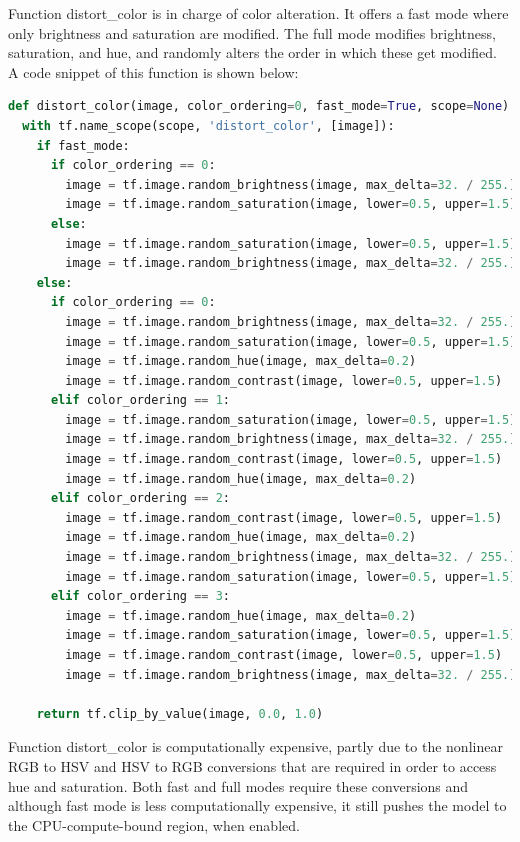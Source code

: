 \documentclass[14pt]{report}
\begin{document}
				Function distort\_color is in charge of color alteration. It offers a fast mode where only brightness and saturation are modified. The full mode modifies brightness, saturation, and hue, and randomly alters the order in which these get modified. A code snippet of this function is shown below:\\
				\begin{lstlisting}[language=Python]
def distort_color(image, color_ordering=0, fast_mode=True, scope=None):
  with tf.name_scope(scope, 'distort_color', [image]):
    if fast_mode:
      if color_ordering == 0:
        image = tf.image.random_brightness(image, max_delta=32. / 255.)
        image = tf.image.random_saturation(image, lower=0.5, upper=1.5)
      else:
        image = tf.image.random_saturation(image, lower=0.5, upper=1.5)
        image = tf.image.random_brightness(image, max_delta=32. / 255.)
    else:
      if color_ordering == 0:
        image = tf.image.random_brightness(image, max_delta=32. / 255.)
        image = tf.image.random_saturation(image, lower=0.5, upper=1.5)
        image = tf.image.random_hue(image, max_delta=0.2)
        image = tf.image.random_contrast(image, lower=0.5, upper=1.5)
      elif color_ordering == 1:
        image = tf.image.random_saturation(image, lower=0.5, upper=1.5)
        image = tf.image.random_brightness(image, max_delta=32. / 255.)
        image = tf.image.random_contrast(image, lower=0.5, upper=1.5)
        image = tf.image.random_hue(image, max_delta=0.2)
      elif color_ordering == 2:
        image = tf.image.random_contrast(image, lower=0.5, upper=1.5)
        image = tf.image.random_hue(image, max_delta=0.2)
        image = tf.image.random_brightness(image, max_delta=32. / 255.)
        image = tf.image.random_saturation(image, lower=0.5, upper=1.5)
      elif color_ordering == 3:
        image = tf.image.random_hue(image, max_delta=0.2)
        image = tf.image.random_saturation(image, lower=0.5, upper=1.5)
        image = tf.image.random_contrast(image, lower=0.5, upper=1.5)
        image = tf.image.random_brightness(image, max_delta=32. / 255.)

    return tf.clip_by_value(image, 0.0, 1.0)
				\end{lstlisting}

				Function distort\_color is computationally expensive, partly due to the nonlinear RGB to HSV and HSV to RGB conversions that are required in order to access hue and saturation. Both fast and full modes require these conversions and although fast mode is less computationally expensive, it still pushes the model to the CPU-compute-bound region, when enabled.\\
\end{document}
